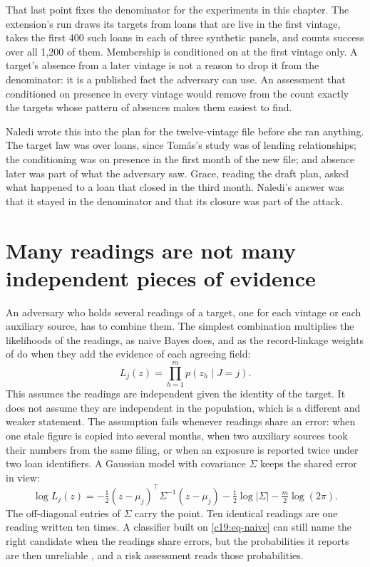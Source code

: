 That last point fixes the denominator for the experiments in this chapter. The extension's
run draws its targets from loans that are live in the first vintage, takes the first 400 such loans
in each of three synthetic panels, and counts success over all 1,200 of them. Membership is
conditioned on at the first vintage only. A target's absence from a later vintage is not a
reason to drop it from the denominator: it is a published fact the adversary can use. An
assessment that conditioned on presence in every vintage would remove from the count
exactly the targets whose pattern of absences makes them easiest to find.

Naledi wrote this into the plan for the twelve-vintage file before she ran anything. The
target law was over loans, since Tom\'as's study was of lending relationships; the conditioning was on presence in the first month of the new file; and absence later was part of what the
adversary saw. Grace, reading the draft plan, asked what happened to a loan that closed in
the third month. Naledi's answer was that it stayed in the denominator and that its closure
was part of the attack.

\section{Many readings are not many independent pieces of evidence}

An adversary who holds several readings of a target, one for each vintage or each auxiliary
source, has to combine them. The simplest combination multiplies the likelihoods of the
readings, as naive Bayes does, and as the record-linkage weights of \citet{fellegi1969} do
when they add the evidence of each agreeing field:
\begin{equation}\label{c19:eq-naive}
L_j(z)=\prod_{h=1}^{m}p(z_h\mid J=j).
\end{equation}
This assumes the readings are independent given the identity of the target. It does not
assume they are independent in the population, which is a different and weaker statement.
The assumption fails whenever readings share an error: when one stale figure is copied
into several months, when two auxiliary sources took their numbers from the same filing,
or when an exposure is reported twice under two loan identifiers. A Gaussian model with
covariance $\Sigma$ keeps the shared error in view:
\begin{equation}\label{c19:eq-gauss}
\log L_j(z)=-\tfrac12(z-\mu_j)^\top\Sigma^{-1}(z-\mu_j)-\tfrac12\log|\Sigma|-\tfrac m2\log(2\pi).
\end{equation}
The off-diagonal entries of $\Sigma$ carry the point. Ten identical readings are one reading written ten times. A classifier built on \eqref{c19:eq-naive} can still name the right candidate when the readings share errors, but the probabilities it reports are then unreliable \citep{domingos1997}, and a risk assessment reads those probabilities.

